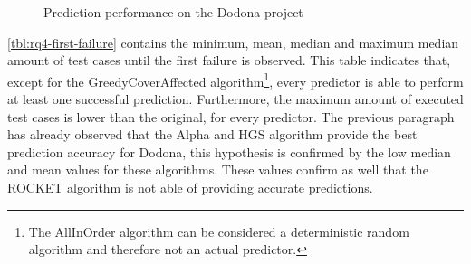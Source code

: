 \begin{figure}
\ContinuedFloat
\centering
{}
\caption{Prediction performance on the Dodona project}
\label{fig:rq4-performance}
\end{figure}

\noindent \autoref{tbl:rq4-first-failure} contains the minimum, mean, median and maximum median amount of test cases until the first failure is observed. This table indicates that, except for the GreedyCoverAffected algorithm\footnote{The AllInOrder algorithm can be considered a deterministic random algorithm and therefore not an actual predictor.}, every predictor is able to perform at least one successful prediction. Furthermore, the maximum amount of executed test cases is lower than the original, for every predictor. The previous paragraph has already observed that the Alpha and HGS algorithm provide the best prediction accuracy for Dodona, this hypothesis is confirmed by the low median and mean values for these algorithms. These values confirm as well that the ROCKET algorithm is not able of providing accurate predictions.

